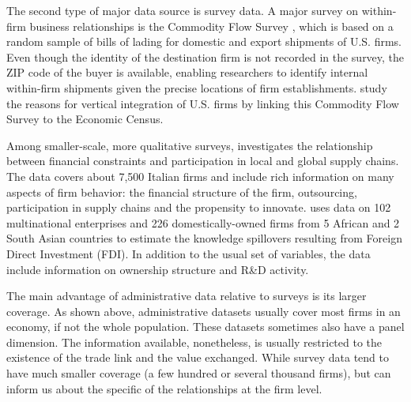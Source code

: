 \documentclass[final, dvipsnames, authoryear,12pt]{elsarticle}
\begin{document}


The second type of major data source is survey data. A major survey on within-firm business relationships is the Commodity Flow Survey \cite{CFS}, which is based on a random sample of bills of lading for domestic and export shipments of U.S. firms. Even though the identity of the destination firm is not recorded in the survey, the ZIP code of the buyer is available, enabling researchers to identify internal within-firm shipments given the precise locations of firm establishments. \cite{atalay2014vertical} study the reasons for vertical integration of U.S. firms by linking this Commodity Flow Survey to the Economic Census.  


Among smaller-scale, more qualitative surveys, \cite{minetti2018financial} investigates the relationship between financial constraints and participation in local and global supply chains. The data covers about 7,500 Italian firms and include rich information on many aspects of firm behavior: the financial structure of the firm, outsourcing, participation in supply chains and the propensity to innovate. \cite{newman2018linked}  uses data on 102 multinational enterprises and 226 domestically-owned firms from 5 African and 2 South Asian countries to estimate the knowledge spillovers resulting from Foreign Direct Investment (FDI). In addition to the usual set of variables, the data include information on ownership structure and R\&D activity.

The main advantage of administrative data relative to surveys is its larger coverage. As shown above, administrative datasets usually cover most firms in an economy, if not the whole population. These datasets sometimes also have a panel dimension. The information available, nonetheless, is usually restricted to the existence of the trade link and the value exchanged. While survey data tend to have much smaller coverage (a few hundred or several thousand firms), but can inform us about the specific of the relationships at the firm level.



\end{document}
